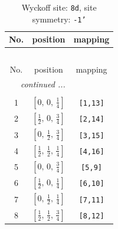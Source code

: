 \documentclass[fleqn,8pt]{jsarticle}
\begin{document}
\begin{longtable}{ccc}
\caption{Wyckoff site: {\tt 8d}, site symmetry: {\tt -1'}}
 \\
 \hline \hline
No. & position & mapping \\ \hline \endfirsthead

\multicolumn{2}{l}{\tablename\ \thetable{}} \\
 \hline \hline
No. & position & mapping \\ \hline \endhead

 \hline \hline
\multicolumn{2}{r}{\footnotesize\it continued ...} \\ \endfoot

 \hline \hline
\multicolumn{2}{r}{} \\ \endlastfoot

1 & $\left[ 0,\, 0,\, \frac{1}{4} \right]$ & {\tt [1,13]} \\ \hline
2 & $\left[ \frac{1}{2},\, 0,\, \frac{3}{4} \right]$ & {\tt [2,14]} \\ \hline
3 & $\left[ 0,\, \frac{1}{2},\, \frac{3}{4} \right]$ & {\tt [3,15]} \\ \hline
4 & $\left[ \frac{1}{2},\, \frac{1}{2},\, \frac{1}{4} \right]$ & {\tt [4,16]} \\ \hline
5 & $\left[ 0,\, 0,\, \frac{3}{4} \right]$ & {\tt [5,9]} \\ \hline
6 & $\left[ \frac{1}{2},\, 0,\, \frac{1}{4} \right]$ & {\tt [6,10]} \\ \hline
7 & $\left[ 0,\, \frac{1}{2},\, \frac{1}{4} \right]$ & {\tt [7,11]} \\ \hline
8 & $\left[ \frac{1}{2},\, \frac{1}{2},\, \frac{3}{4} \right]$ & {\tt [8,12]} \\
\end{longtable}
\renewcommand{\arraystretch}{1.2}
\end{document}

